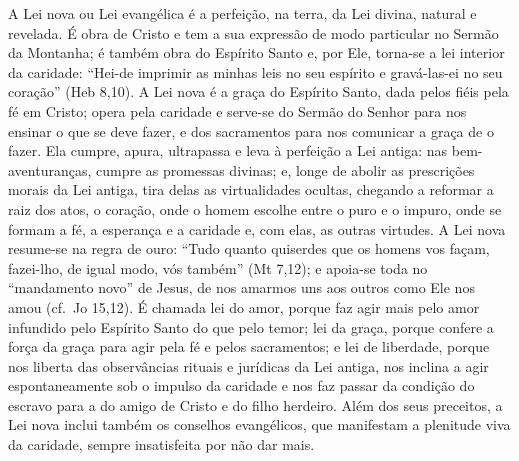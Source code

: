 A Lei nova ou Lei evangélica é a perfeição, na terra, da Lei divina, natural e revelada. É obra de Cristo e tem a sua expressão de modo particular no Sermão da Montanha; é também obra do Espírito Santo e, por Ele, torna-se a lei interior da caridade: ``Hei-de imprimir as minhas leis no seu espírito e gravá-las-ei no seu coração'' (Heb 8,10). A Lei nova é a graça do Espírito Santo, dada pelos fiéis pela fé em Cristo; opera pela caridade e serve-se do Sermão do Senhor para nos ensinar o que se deve fazer, e dos sacramentos para nos comunicar a graça de o fazer. Ela cumpre, apura, ultrapassa e leva à perfeição a Lei antiga: nas bem-aventuranças, cumpre as promessas divinas; e, longe de abolir as prescrições morais da Lei antiga, tira delas as virtualidades ocultas, chegando a reformar a raiz dos atos, o coração, onde o homem escolhe entre o puro e o impuro, onde se formam a fé, a esperança e a caridade e, com elas, as outras virtudes. A Lei nova resume-se na regra de ouro: ``Tudo quanto quiserdes que os homens vos façam, fazei-lho, de igual modo, vós também'' (Mt 7,12); e apoia-se toda no ``mandamento novo'' de Jesus, de nos amarmos uns aos outros como Ele nos amou (cf.~Jo 15,12). É chamada lei do amor, porque faz agir mais pelo amor infundido pelo Espírito Santo do que pelo temor; lei da graça, porque confere a força da graça para agir pela fé e pelos sacramentos; e lei de liberdade, porque nos liberta das observâncias rituais e jurídicas da Lei antiga, nos inclina a agir espontaneamente sob o impulso da caridade e nos faz passar da condição do escravo para a do amigo de Cristo e do filho herdeiro. Além dos seus preceitos, a Lei nova inclui também os conselhos evangélicos, que manifestam a plenitude viva da caridade, sempre insatisfeita por não dar mais.

